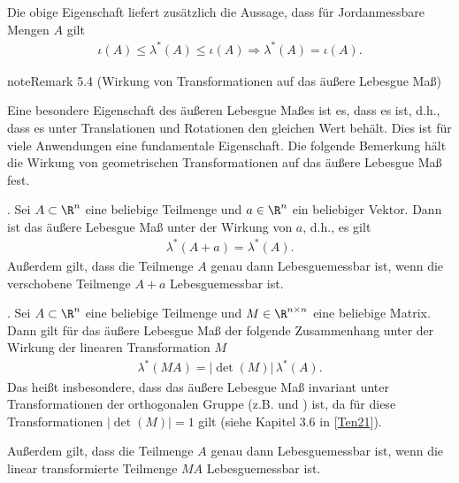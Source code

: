 \documentclass[letterpaper,10pt,english]{jupyterBook}
\begin{document}
\sphinxAtStartPar
Die obige Eigenschaft liefert zusätzlich die Aussage, dass für Jordan\sphinxhyphen{}messbare Mengen \(A\) gilt
\begin{equation*}
\begin{split}\iota(A)\leq\lambda^\ast(A)\leq\iota(A)\Rightarrow \lambda^\ast(A) = \iota(A).\end{split}
\end{equation*}\label{masstheorie/masstheorie:rem:transinvariance}
\begin{sphinxadmonition}{note}{Remark 5.4 (Wirkung von Transformationen auf das äußere Lebesgue Maß)}



\sphinxAtStartPar
Eine besondere Eigenschaft des äußeren Lebesgue Maßes ist es, dass es  ist, d.h., dass es unter Translationen und Rotationen den gleichen Wert behält.
Dies ist für viele Anwendungen eine fundamentale Eigenschaft.
Die folgende Bemerkung hält die Wirkung von geometrischen Transformationen auf das äußere Lebesgue Maß fest.

. Sei \(A \subset \R^n\) eine beliebige Teilmenge und \(a \in \R^n\) ein beliebiger Vektor.
Dann ist das äußere Lebesgue Maß  unter der Wirkung von \(a\), d.h., es gilt
\begin{equation*}
\begin{split}\lambda^*(A + a) = \lambda^*(A).\end{split}
\end{equation*}
\sphinxAtStartPar
Außerdem gilt, dass die Teilmenge \(A\) genau dann Lebesgue\sphinxhyphen{}messbar ist, wenn die verschobene Teilmenge \(A + a\) Lebesgue\sphinxhyphen{}messbar ist.

. Sei \(A \subset \R^n\) eine beliebige Teilmenge und \(M \in \R^{n\times n}\) eine beliebige Matrix.
Dann gilt für das äußere Lebesgue Maß der folgende Zusammenhang unter der Wirkung der linearen Transformation \(M\)
\begin{equation*}
\begin{split}\lambda^*(MA) = |\!\operatorname{det}(M)| \, \lambda^*(A).\end{split}
\end{equation*}
\sphinxAtStartPar
Das heißt insbesondere, dass das äußere Lebesgue Maß invariant unter Transformationen der orthogonalen Gruppe (z.B.  und ) ist, da für diese Transformationen \(|\!\operatorname{det}(M)| = 1\) gilt (siehe Kapitel 3.6 in {[}\hyperlink{cite.references:id12}{Ten21}{]}).

\sphinxAtStartPar
Außerdem gilt, dass die Teilmenge \(A\) genau dann Lebesgue\sphinxhyphen{}messbar ist, wenn die linear transformierte Teilmenge \(MA\) Lebesgue\sphinxhyphen{}messbar ist.
\end{sphinxadmonition}
\end{document}
